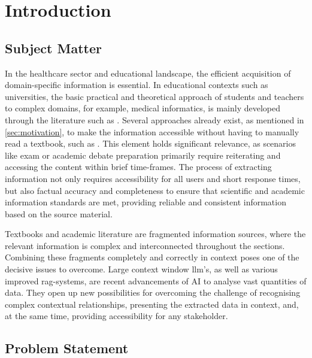 \chapter{Introduction}\label{ch:introduction}
\section{Subject Matter}\label{sec:subject matter}

In the healthcare sector and educational landscape, the efficient acquisition of domain-specific information is essential. 
In educational contexts such as universities, the basic practical and theoretical approach of students and teachers to complex domains, for example, medical informatics, is mainly developed through the literature such as \citet{bb2}.
%
Several approaches already exist, as mentioned in \cref{sec:motivation}, to make the information accessible without having to manually read a textbook, such as \citet{bb2}.
This element holds significant relevance, as scenarios like exam or academic debate preparation primarily require reiterating and accessing the content within brief time-frames.
%
The process of extracting information not only requires accessibility for all users and short response times, but also factual accuracy and completeness to ensure that scientific and academic information standards are met, providing reliable and consistent information based on the source material.
 
Textbooks and academic literature are fragmented information sources, where the relevant information is complex and interconnected throughout the sections. 
Combining these fragments completely and correctly in context poses one of the decisive issues to overcome. 
%
Large context window \ac{llm}'s, as well as various improved \ac{rag}-systems, are recent advancements of AI to analyse vast quantities of data.
They open up new possibilities for overcoming the challenge of recognising complex contextual relationships, presenting the extracted data in context, and, at the same time, providing accessibility for any stakeholder.

\section{Problem Statement}\label{sec:problem statement}

